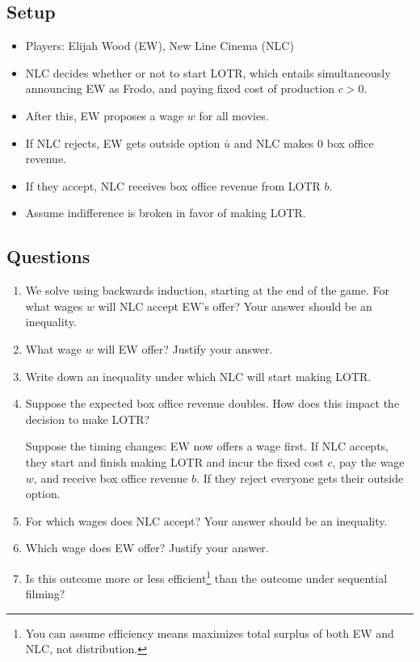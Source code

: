 \documentclass{article}
\begin{document}
\subsection{Setup}

\begin{itemize}
    \item Players: Elijah Wood (EW), New Line Cinema (NLC) 
    \item NLC decides whether or not to start LOTR, which entails simultaneously announcing EW as Frodo, and paying fixed cost of production $c>0$.
    \item After this, EW proposes a wage $w$ for all movies.
    \item If NLC rejects, EW gets outside option $\bar u$ and NLC makes 0 box office revenue.
    \item If they accept, NLC receives box office revenue from LOTR $b$.
    \item Assume indifference is broken in favor of making LOTR.
\end{itemize}

\subsection{Questions}

\begin{enumerate}
\item We solve using backwards induction, starting at the end of the game. For what wages $w$ will NLC accept EW's offer? Your answer should be an inequality.
\item What wage $w$ will EW offer? Justify your answer.

\item Write down an inequality under which NLC will start making LOTR.

\item Suppose the expected box office revenue doubles. How does this impact the decision to make LOTR?
    

    Suppose the timing changes: EW now offers a wage first. If NLC accepts, they start and finish making LOTR and incur the fixed cost $c$, pay the wage $w$, and receive box office revenue $b$. If they reject everyone gets their outside option.

    \item For which wages does NLC accept? Your answer should be an inequality.

\item Which wage does EW offer? Justify your answer.

    \item Is this outcome more or less efficient\footnote{You can assume efficiency means maximizes total surplus of both EW and NLC, not distribution.} than the outcome under sequential filming?

    
\end{enumerate}
\end{document}
